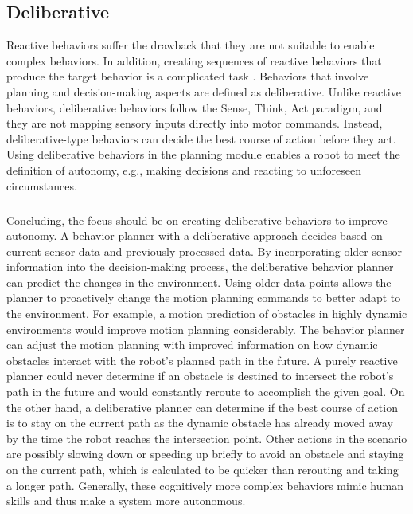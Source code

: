\subsection{Deliberative}
Reactive behaviors suffer the drawback that they are not suitable to enable complex behaviors. In addition, creating sequences of reactive behaviors that produce the target behavior is a complicated task \cite{murphy2000}. Behaviors that involve planning and decision-making aspects are defined as deliberative. Unlike reactive behaviors, deliberative behaviors follow the Sense, Think, Act paradigm, and they are not mapping sensory inputs directly into motor commands. Instead, deliberative-type behaviors can decide the best course of action before they act. Using deliberative behaviors in the planning module enables a robot to meet the definition of autonomy, e.g., making decisions and reacting to unforeseen circumstances. 
\subparagraph*{}
Concluding, the focus should be on creating deliberative behaviors to improve autonomy. A behavior planner with a deliberative approach decides based on current sensor data and previously processed data. By incorporating older sensor information into the decision-making process, the deliberative behavior planner can predict the changes in the environment. Using older data points allows the planner to proactively change the motion planning commands to better adapt to the environment. For example, a motion prediction of obstacles in highly dynamic environments would improve motion planning considerably. The behavior planner can adjust the motion planning with improved information on how dynamic obstacles interact with the robot's planned path in the future. A purely reactive planner could never determine if an obstacle is destined to intersect the robot's path in the future and would constantly reroute to accomplish the given goal. On the other hand, a deliberative planner can determine if the best course of action is to stay on the current path as the dynamic obstacle has already moved away by the time the robot reaches the intersection point. Other actions in the scenario are possibly slowing down or speeding up briefly to avoid an obstacle and staying on the current path, which is calculated to be quicker than rerouting and taking a longer path. 
Generally, these cognitively more complex behaviors mimic human skills and thus make a system more autonomous. 

%

